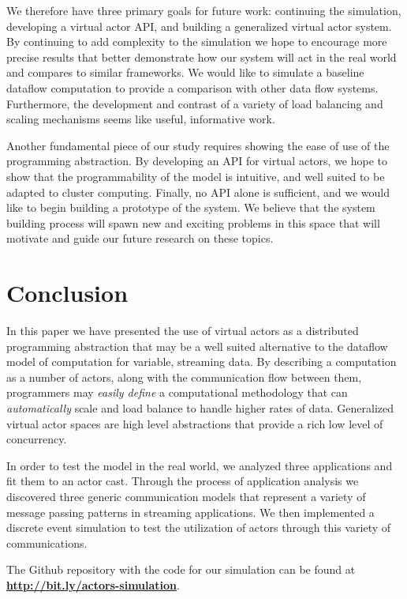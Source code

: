 \documentclass[draftclsnofoot,onecolumn,conference,11pt]{IEEEtran}
\newcommand{\bennote}[1]{\textcolor{magenta}{\bf #1}}
\begin{document}
We therefore have three primary goals for future work: continuing the simulation, developing a virtual actor API, and building a generalized virtual actor system. By continuing to add complexity to the simulation we hope to encourage more precise results that better demonstrate how our system will act in the real world and compares to similar frameworks. We would like to simulate a baseline dataflow computation to provide a comparison with other data flow systems. Furthermore, the development and contrast of a variety of load balancing and scaling mechanisms seems like useful, informative work.

Another fundamental piece of our study requires showing the ease of use of the programming abstraction. By developing an API for virtual actors, we hope to show that the programmability of the model is intuitive, and well suited to be adapted to cluster computing. Finally, no API alone is sufficient, and we would like to begin building a prototype of the system. We believe that the system building process will spawn new and exciting problems in this space that will motivate and guide our future research on these topics.

\section{Conclusion}

In this paper we have presented the use of virtual actors as a distributed programming abstraction that may be a well suited alternative to the dataflow model of computation for variable, streaming data. By describing a computation as a number of actors, along with the communication flow between them, programmers may \textit{easily define} a computational methodology that can \textit{automatically} scale and load balance to handle higher rates of data. Generalized virtual actor spaces are high level abstractions that provide a rich low level of concurrency.

In order to test the model in the real world, we analyzed three applications and fit them to an actor cast. Through the process of application analysis we discovered three generic communication models that represent a variety of message passing patterns in streaming applications. We then implemented a discrete event simulation to test the utilization of actors through this variety of communications.


The Github repository with the code for our simulation can be found at \bennote{\url{http://bit.ly/actors-simulation}}.
\end{document}
